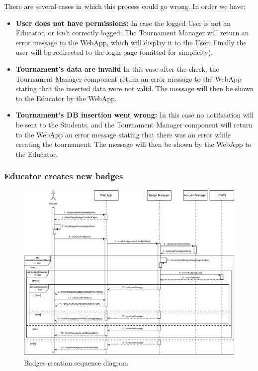 \documentclass{article}
\begin{document}
{        There are several cases in which this process could go wrong. In order we have:
        \begin{itemize}
            \item \textbf{User does not have permissions:} In case the logged User is not an
            Educator, or isn't correctly logged. The Tournament Manager will return an
            error message to the WebApp, which will display it to the User.
            Finally the user will be redirected to the login page (omitted for simplicity).
            \item \textbf{Tournament's data are invalid} In this case after the check, the 
            Tournament Manager component return an error message to the WebApp stating 
            that the inserted data were not valid. The message will then be shown to the 
            Educator by the WebApp.
            \item \textbf{Tournament's DB insertion went wrong:} In this case no 
            notification will be sent to the Students, and the Tournament Manager component will 
            return to the WebApp an error message stating that there was an error while 
            creating the tournament.
            The message will then be shown by the WebApp to the Educator.
        \end{itemize}

    \subsubsection{Educator creates new badges}
        \begin{figure}[H]
            \centering
            \hspace*{-1cm}\includegraphics[scale=0.65]{Sequence/Sequence4DD.pdf}
            \caption{Badges creation sequence diagram}
            \label{fig:Sequence4DD}
        \end{figure}

}
\end{document}
